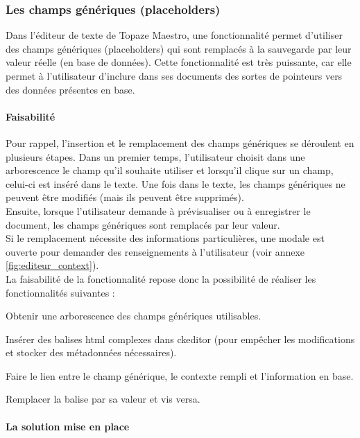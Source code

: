 \subsubsection{Les champs génériques (placeholders)}
Dans l'éditeur de texte de Topaze Maestro, une fonctionnalité permet d'utiliser des champs génériques (placeholders) qui sont remplacés à la sauvegarde par leur valeur réelle (en base de données). Cette fonctionnalité est très puissante, car elle permet à l'utilisateur d'inclure dans ses documents des sortes de pointeurs vers des données présentes en base. 

\paragraph*{Faisabilité\\}
Pour rappel, l'insertion et le remplacement des champs génériques se déroulent en plusieurs étapes. Dans un premier temps, l'utilisateur choisit dans une arborescence le champ qu'il souhaite utiliser et lorsqu'il clique sur un champ, celui-ci est inséré dans le texte.
Une fois dans le texte, les champs génériques ne peuvent être modifiés (mais ils peuvent être supprimés).\\
Ensuite, lorsque l'utilisateur demande à prévisualiser ou à enregistrer le document, les champs génériques sont remplacés par leur valeur.\\
Si le remplacement nécessite des informations particulières, une modale est ouverte pour demander des renseignements à l'utilisateur (voir annexe \ref{fig:editeur_context}).\\
 
La faisabilité de la fonctionnalité repose donc la possibilité de réaliser les fonctionnalités suivantes : %
\begin{sitemize}
\item Obtenir une arborescence des champs génériques utilisables.
\item Insérer des balises html complexes dans ckeditor (pour empêcher les modifications et stocker des métadonnées nécessaires).
\item Faire le lien entre le champ générique, le contexte rempli et l'information en base.
\item Remplacer la balise par sa valeur et vis versa.
\end{sitemize}

\paragraph*{La solution mise en place}

